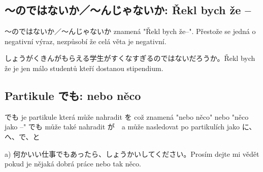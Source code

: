 \subsection{〜のではないか／〜んじゃないか: Řekl bych že --}

〜のではないか／〜んじゃないか znamená "Řekl bych že--". Přestože se jedná o negativní výraz, nezpůsobí že celá věta je negativní.

しょうがくきんがもらえる学生がすくなすぎるのではないだろうか。Řekl bych že je jen málo studentů kteří dostanou stipendium.

\subsection{Partikule でも: nebo něco}

でも je partikule která může nahradit を což znamená "nebo něco" nebo "něco jako --" でも může také nahradit が　a může nasledovat po partikulích jako に、へ、で、と

a) 何かいい仕事でもあったら、しょうかいしてください。Prosím dejte mi vědět pokud je nějaká dobrá práce nebo tak něco.



